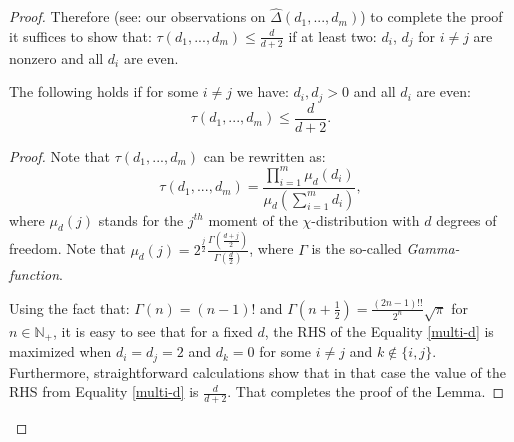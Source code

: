\begin{proof}
Therefore (see: our observations on $\widehat{\Delta}(d_{1},...,d_{m})$) to complete the proof it suffices to show that: $\tau(d_{1},...,d_{m}) \leq \frac{d}{d+2}$ if at least two: $d_{i}$, $d_{j}$ for $i \neq j$ are nonzero and all $d_{i}$ are even.
\begin{lemma}
\label{tau-lemma}
The following holds if for some $i \neq j$ we have: $d_{i}, d_{j} > 0$ and all $d_{i}$ are even:
\begin{equation}
\tau(d_{1},...,d_{m}) \leq \frac{d}{d+2}.    
\end{equation}
\end{lemma}
\begin{proof}
Note that $\tau(d_{1},...,d_{m})$ can be rewritten as:
\begin{equation}
\label{multi-d}
\tau(d_{1},...,d_{m}) = \frac{\prod_{i=1}^{m} \mu_{d}(d_{i})}{\mu_{d}(\sum_{i=1}^{m} d_i)},    
\end{equation}
where $\mu_{d}(j)$ stands for the $j^{th}$ moment of the $\chi$-distribution with $d$ degrees of freedom.
Note that $\mu_{d}(j) = 2^{\frac{j}{2}}
\frac{\Gamma(\frac{d+j}{2})}{\Gamma(\frac{d}{2})}$,
where $\Gamma$ is the so-called \textit{Gamma-function}.

Using the fact that: $\Gamma(n) = (n-1)!$ and $\Gamma(n+\frac{1}{2})=\frac{(2n-1)!!}{2^{n}}\sqrt{\pi}$ for $n \in \mathbb{N}_{+}$, it is easy to see 
that for a fixed $d$, the RHS of the Equality \ref{multi-d} is maximized when $d_{i}=d_{j}=2$ and $d_{k}=0$ for some $i \neq j$ and $k \notin \{i,j\}$. Furthermore, straightforward calculations show that in that case the value of the RHS from Equality \ref{multi-d} is $\frac{d}{d+2}$. That completes the proof of the Lemma.
\end{proof}



\end{proof}
